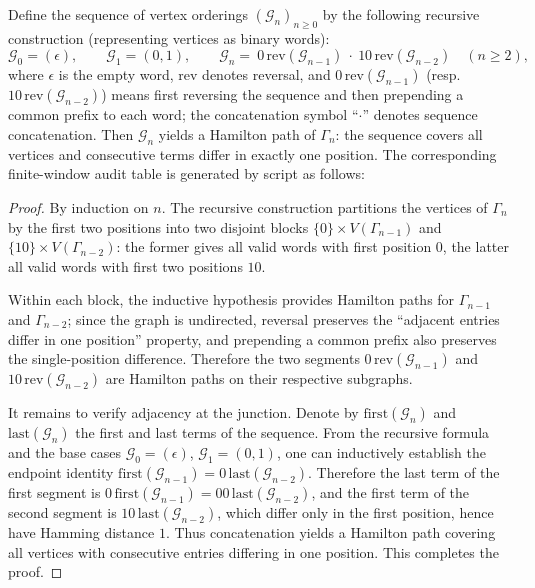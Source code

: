 \begin{theorem}\label{thm:pom-fibcube-gray-hamilton}
Define the sequence of vertex orderings \((\mathcal G_n)_{n\ge 0}\) by the following recursive construction (representing vertices as binary words):
\[
\mathcal G_0=(\epsilon),\qquad
\mathcal G_1=(0,1),\qquad
\mathcal G_n=\ 0\,\mathrm{rev}(\mathcal G_{n-1})\ \cdot\ 10\,\mathrm{rev}(\mathcal G_{n-2})\quad(n\ge 2),
\]
where \(\epsilon\) is the empty word, \(\mathrm{rev}\) denotes reversal,
and \(0\,\mathrm{rev}(\mathcal G_{n-1})\) (resp.\ \(10\,\mathrm{rev}(\mathcal G_{n-2})\)) means first reversing the sequence and then prepending a common prefix to each word;
the concatenation symbol ``\(\cdot\)'' denotes sequence concatenation.
Then \(\mathcal G_n\) yields a Hamilton path of \(\Gamma_n\): the sequence covers all vertices and consecutive terms differ in exactly one position.
The corresponding finite-window audit table is generated by script as follows:

\end{theorem}

\begin{proof}
By induction on \(n\). The recursive construction partitions the vertices of \(\Gamma_n\) by the first two positions into two disjoint blocks
\(
\{0\}\times V(\Gamma_{n-1})
\)
and
\(
\{10\}\times V(\Gamma_{n-2})
\):
the former gives all valid words with first position \(0\), the latter all valid words with first two positions \(10\).
\par
Within each block, the inductive hypothesis provides Hamilton paths for \(\Gamma_{n-1}\) and \(\Gamma_{n-2}\);
since the graph is undirected, reversal preserves the ``adjacent entries differ in one position'' property,
and prepending a common prefix also preserves the single-position difference.
Therefore the two segments
\(
0\,\mathrm{rev}(\mathcal G_{n-1})
\)
and
\(
10\,\mathrm{rev}(\mathcal G_{n-2})
\)
are Hamilton paths on their respective subgraphs.
\par
It remains to verify adjacency at the junction.
Denote by \(\mathrm{first}(\mathcal G_n)\) and \(\mathrm{last}(\mathcal G_n)\) the first and last terms of the sequence.
From the recursive formula and the base cases \(\mathcal G_0=(\epsilon)\), \(\mathcal G_1=(0,1)\), one can inductively establish the endpoint identity
\(
\mathrm{first}(\mathcal G_{n-1})=0\,\mathrm{last}(\mathcal G_{n-2})
\).
Therefore the last term of the first segment is
\(
0\,\mathrm{first}(\mathcal G_{n-1})=00\,\mathrm{last}(\mathcal G_{n-2})
\),
and the first term of the second segment is
\(
10\,\mathrm{last}(\mathcal G_{n-2})
\),
which differ only in the first position, hence have Hamming distance \(1\).
Thus concatenation yields a Hamilton path covering all vertices with consecutive entries differing in one position. This completes the proof.
\end{proof}

